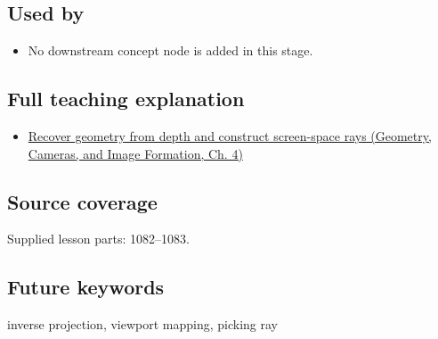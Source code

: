 \subsection{Used by}\label{appendix-f1a6d43e80d1-used-by}

\begin{itemize}
\tightlist
\item
  No downstream concept node is added in this stage.
\end{itemize}

\subsection{Full teaching explanation}\label{appendix-f1a6d43e80d1-full-teaching-explanation}

\begin{itemize}
\tightlist
\item
  \href{../03-Geometry-Cameras-and-Image-Formation/main.pdf\#nameddest=02-foundations-ii-ch035-recover-geometry-from-depth-and-construct-screen-space-rays}{Recover geometry from depth and construct screen-space rays (Geometry, Cameras, and Image Formation, Ch. 4)}
\end{itemize}

\subsection{Source coverage}\label{appendix-f1a6d43e80d1-source-coverage}

Supplied lesson parts: 1082--1083.

\subsection{Future keywords}\label{appendix-f1a6d43e80d1-future-keywords}

inverse projection, viewport mapping, picking ray
